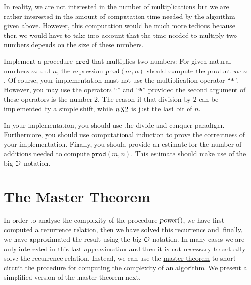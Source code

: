 \remark
In reality, we are not interested in the number of multiplications but we are rather interested
in the amount of computation time needed by the algorithm given above.
However, this computation would be much more tedious because then we would have to take into account
that the time needed to multiply two numbers depends on the size of these numbers.

\exercise
Implement a procedure $\mathtt{prod}$ that multiplies two numbers:
For given natural numbers $m$ and $n$, the expression $\mathtt{prod}(m, n)$  should compute the product
$m\cdot n$.  Of course, your implementation must not use the multiplication operator ``\texttt{*}''.
However, you may use the operators ``\texttt{}'' and ``\texttt{\%}'' provided
the second argument of these
operators is the number $2$.  The reason it that division by $2$ can be implemented by a simple
shift, while $n\, \texttt{\symbol{37}}\, 2$ is just the last bit of $n$.

In your implementation, you should use the
divide and conquer paradigm.  Furthermore, you should use computational induction to prove the
correctness of your implementation.  Finally, you should provide an estimate for the number of
additions needed to compute $\mathtt{prod}(m,n)$.  This estimate should make use of the big $\mathcal{O}$
notation. 
\eox


\section{The Master Theorem}
In order to analyse the complexity of  the procedure $\textsl{power}()$,
we have first computed a  recurrence relation, then we have solved this recurrence and, finally,  
we have approximated the result using the big $\mathcal{O}$ notation.  In many cases we are only interested in this
last approximation and then it is not necessary to actually solve the recurrence relation.  
Instead, we can use the 
\href{http://en.wikipedia.org/wiki/Master_theorem#Generic_form}{master theorem} to short
circuit the procedure for computing the complexity of an algorithm. 
We present a simplified version of the master theorem next.
\pagebreak

